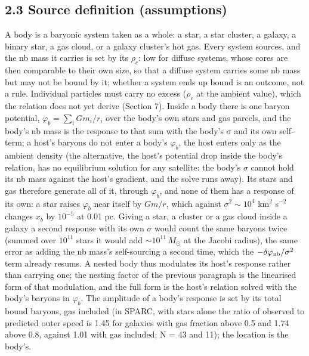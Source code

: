 \documentclass[
  10pt,
]{article}
\begin{document}
\subsection{2.3 Source definition (assumptions)}\label{source-definition-assumptions}

A body is a baryonic system taken as a whole: a star, a star cluster, a galaxy, a binary star, a gas cloud, or a galaxy cluster's hot gas. Every system sources, and the nb mass it carries is set by its $\rho_c$: low for diffuse systems, whose cores are then comparable to their own size, so that a diffuse system carries some nb mass but may not be bound by it; whether a system ends up bound is an outcome, not a rule. Individual particles must carry no excess ($\rho_c$ at the ambient value), which the relation does not yet derive (Section 7). Inside a body there is one baryon potential, $\varphi_b=\sum_i Gm_i/r_i$ over the body's own stars and gas parcels, and the body's nb mass is the response to that sum with the body's $\sigma$ and its own self-term; a host's baryons do not enter a body's $\varphi_b$, the host enters only as the ambient density (the alternative, the host's potential drop inside the body's relation, has no equilibrium solution for any satellite: the body's $\sigma$ cannot hold its nb mass against the host's gradient, and the solve runs away). Its stars and gas therefore generate all of it, through $\varphi_b$, and none of them has a response of its own: a star raises $\varphi_b$ near itself by $Gm/r$, which against $\sigma^2\sim10^4$ km$^2$ s$^{-2}$ changes $x_b$ by $10^{-5}$ at 0.01 pc. Giving a star, a cluster or a gas cloud inside a galaxy a second response with its own $\sigma$ would count the same baryons twice (summed over $10^{11}$ stars it would add $\sim10^{11}\,M_\odot$ at the Jacobi radius), the same error as adding the nb mass's self-sourcing a second time, which the $-\delta\varphi_{\rm nb}/\sigma^2$ term already resums. A nested body thus modulates its host's response rather than carrying one; the nesting factor of the previous paragraph is the linearised form of that modulation, and the full form is the host's relation solved with the body's baryons in $\varphi_b$. The amplitude of a body's response is set by its total bound baryons, gas included (in SPARC, with stars alone the ratio of observed to predicted outer speed is 1.45 for galaxies with gas fraction above 0.5 and 1.74 above 0.8, against 1.01 with gas included; N = 43 and 11); the location is the body's.
\end{document}
